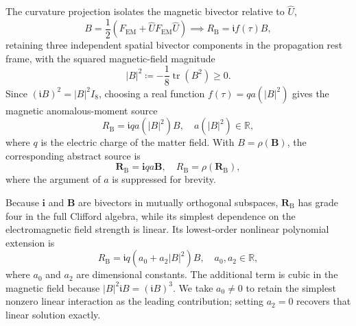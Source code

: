 The curvature projection isolates the magnetic bivector relative to $\hat{U}$,
\begin{equation}\label{eq_projected_magnetic_matrix}
    B=\frac{1}{2}\left(F_{\mathrm{EM}}+\hat{U}F_{\mathrm{EM}}\hat{U}\right) \implies R_{\mathrm{B}}=\mathfrak{i}f(\tau)B,
\end{equation}
retaining three independent spatial bivector components in the propagation rest frame, with the squared magnetic-field magnitude
\begin{equation}
    |B|^{2}\coloneqq-\frac{1}{8}\operatorname{tr}\left(B^{2}\right) \ge 0.
\end{equation}
Since $(\mathfrak{i}B)^2=|B|^2I_8$, choosing a real function $f(\tau)=qa(|B|^2)$ gives the magnetic anomalous-moment source
\begin{equation}\label{eq_nonlinear_magnetic_source}
    R_{\mathrm{B}}=\mathfrak{i}qa(|B|^2)B, \quad a(|B|^2)\in\mathbb{R},
\end{equation}
where $q$ is the electric charge of the matter field. With $B=\rho(\mathbf{B})$, the corresponding abstract source is
\begin{equation}
    \mathbf{R}_{\mathrm{B}}=\mathbf{i}qa\mathbf{B}, \quad R_{\mathrm{B}}=\rho(\mathbf{R}_{\mathrm{B}}),
\end{equation}
where the argument of $a$ is suppressed for brevity.

Because $\mathbf{i}$ and $\mathbf{B}$ are bivectors in mutually orthogonal subspaces, $\mathbf{R}_{\mathrm{B}}$ has grade four in the full Clifford algebra, while its simplest dependence on the electromagnetic field strength is linear. Its lowest-order nonlinear polynomial extension is
\begin{equation}\label{eq_cubic_magnetic_source}
    R_{\mathrm{B}}=\mathfrak{i}q\left(a_0+a_2|B|^2\right)B, \quad a_0,a_2\in\mathbb{R},
\end{equation}
where $a_0$ and $a_2$ are dimensional constants. The additional term is cubic in the magnetic field because $|B|^2\mathfrak{i}B=(\mathfrak{i}B)^3$. We take $a_0\neq0$ to retain the simplest nonzero linear interaction as the leading contribution; setting $a_2=0$ recovers that linear solution exactly.

